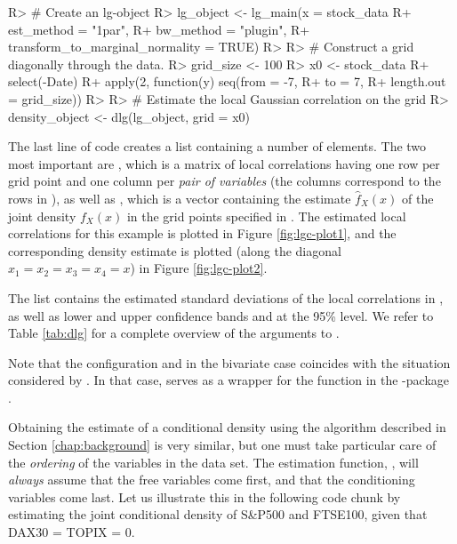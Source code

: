 \begin{example}
R> # Create an lg-object
R> lg_object <- lg_main(x = stock_data %
R+                      est_method = "1par",
R+                      bw_method = "plugin",
R+                      transform_to_marginal_normality = TRUE)
R> 
R> # Construct a grid diagonally through the data.
R> grid_size <- 100
R> x0 <- stock_data %
R+   select(-Date) %
R+   apply(2, function(y) seq(from = -7,
R+                            to = 7,
R+                            length.out = grid_size))
R> 
R> # Estimate the local Gaussian correlation on the grid
R> density_object <- dlg(lg_object, grid = x0)
\end{example}
The last line of code creates a list containing a number of elements. The two most important are , which is a matrix of local correlations having one row per grid point and one column per \emph{pair of variables} (the columns correspond to the rows in ), as well as , which is a vector containing the estimate \(\widehat f_X\left(x\right)\) of the joint density \(f_X\left(x\right)\) in the grid points specified in . The estimated local correlations for this example is plotted in Figure \ref{fig:lgc-plot1}, and the corresponding density estimate is plotted (along the diagonal \(x_1=x_2=x_3=x_4=x\)) in Figure \ref{fig:lgc-plot2}.

The list  contains the estimated standard deviations of the local correlations in , as well
as lower and upper confidence bands  and  at the 95\% level. We refer to Table \ref{tab:dlg} for a complete overview of the arguments to .

Note that the configuration  and  in the bivariate case coincides with the situation considered by \cite{tjos:huft:2013}. In that case,  serves as a wrapper for the function  in the -package \citep{bere:klep:tjos:2014}.

Obtaining the estimate of a conditional density using the \cite{otne:tjos:2018} algorithm described in Section \ref{chap:background} is very similar, but one must take particular care of the \emph{ordering} of the variables in the data set. The estimation function, , will \emph{always} assume that the free variables come first, and that the conditioning variables come last. Let us illustrate this in the following code chunk by estimating the joint conditional density of S\&P500 and FTSE100, given that DAX30 = TOPIX = 0.

